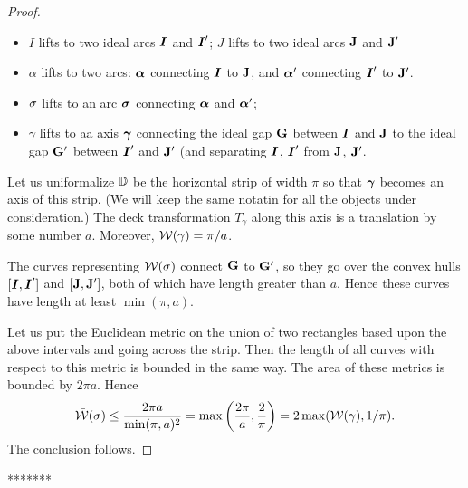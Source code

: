 {{\begin{proof}
\begin{itemize}
\item $I$ lifts to two ideal arcs ${\boldsymbol{I}}$ and ${\boldsymbol{I}}'$; 
          $J$ lifts to two ideal arcs ${\mathbf{J}}$ and ${\mathbf{J}}'$

\item $\alpha$ lifts to two arcs: ${\boldsymbol{\alpha}}$ connecting ${\boldsymbol{I}}$ to ${\mathbf{J}}$,
  and ${\boldsymbol{\alpha}}'$ connecting ${\boldsymbol{I}}'$ to ${\mathbf{J}}'$. 

\item ${\sigma}$ lifts to an arc ${\boldsymbol{\sigma}}$ connecting ${\boldsymbol{\alpha}}$ and ${\boldsymbol{\alpha}}'$;

\item $\gamma$ lifts to aa axis ${\boldsymbol{\gamma}}$ connecting the ideal gap ${\mathbf{G}}$
  between ${\boldsymbol{I}}$ and ${\mathbf{J}}$ to the ideal gap ${\mathbf{G}}'$ between ${\boldsymbol{I}}'$ and ${\mathbf{J}}'$
  (and separating ${\boldsymbol{I}}$, ${\boldsymbol{I}}'$ from ${\mathbf{J}}$, ${\mathbf{J}}'$.

\end{itemize} 

Let us uniformalize ${\Bbb D}$ be the horizontal strip of width $\pi$ so
that ${\boldsymbol{\gamma}}$ becomes an axis of this strip. (We will keep the same  notatin 
for all the objects under consideration.) The deck transformation
$T_\gamma$
along this axis is a translation by some number $a$. Moreover,
${\mathcal W}(\gamma) = \pi/a$. 

The curves representing ${\mathcal W}({\sigma})$ connect ${\mathbf{G}}$ to ${\mathbf{G}}'$,
so they go over the convex hulls  $[{\boldsymbol{I}}, {\boldsymbol{I}}']$ and $[{\mathbf{J}}, {\mathbf{J}}']$,
both of which have length greater than $a$. Hence these curves have
length at least $\min (\pi, a)$. 

Let us put the Euclidean metric on the union of two rectangles based upon the above
intervals
and going across the strip. Then the length of all curves with respect to this
metric   is bounded in the same way. The area of these metrics is
bounded by $2\pi a$. Hence   
$$
  \bar{{\mathcal W}}({\sigma}) \leq \frac {2\pi a} { \min (\pi, a)^2  } =\max \left(\frac{2\pi}
  a, \frac 2\pi \right) = 2 \max ( {\mathcal W}(\gamma), 1/\pi). 
$$
The conclusion follows. 
\end{proof}

******* } 

}
